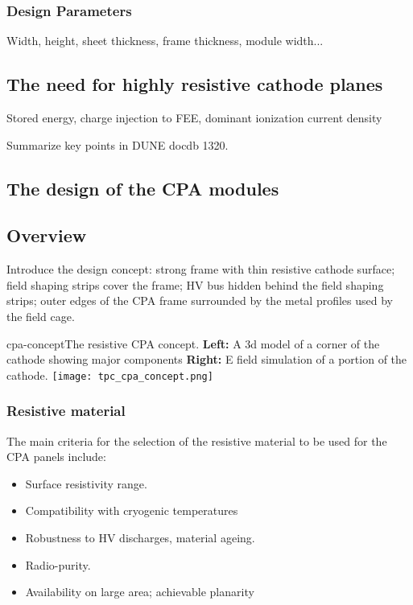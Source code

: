 \subsubsection{Design Parameters}

Width, height, sheet thickness, frame thickness, module width...


\subsection{The need for highly resistive cathode planes}
Stored energy, charge injection to FEE, dominant ionization current density

Summarize key points in DUNE docdb 1320.

\subsection{The design of the CPA modules}

\subsection{Overview}

Introduce the design concept: strong frame with thin resistive cathode surface; field shaping strips cover the frame; HV bus hidden behind the field shaping strips; outer edges of the CPA frame surrounded by the metal profiles used by the field cage.

\begin{cdrfigure}{cpa-concept}{The resistive CPA concept. 
 {\bf Left:} A 3d model of a corner of the cathode showing major components {\bf Right:} E field simulation of a portion of the cathode.} 
\texttt{[image: tpc\_cpa\_concept.png]}
\end{cdrfigure}


\subsubsection{Resistive material}

The main criteria for the selection of the resistive material to be used for the CPA panels include: 
\begin{itemize}	
\item Surface resistivity range.
\item Compatibility with cryogenic temperatures
\item Robustness to HV discharges, material ageing.
\item Radio-purity.
\item Availability on large area; achievable planarity 
\end{itemize}

